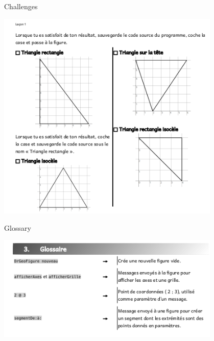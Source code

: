 \documentclass{beamer}
\begin{document}
\begin{frame}{Challenges}
\begin{center}
  \includegraphics[width=0.8\textwidth]{Triangle2a.png}
\end{center}
\end{frame}
%
\begin{frame}{Glossary}
\begin{center}
  \includegraphics[width=0.8\textwidth]{Triangle2b.png}
\end{center}  
\end{frame}
\end{document}
